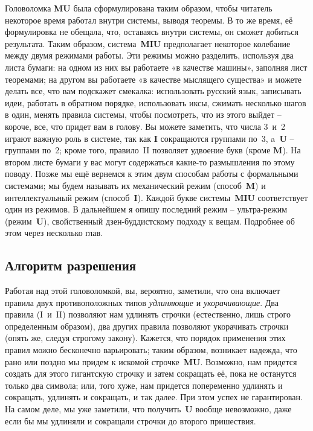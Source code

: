 \documentclass[../main.tex]{subfiles}
\begin{document}
Головоломка \textbf{MU} была сформулирована таким образом, чтобы читатель некоторое время работал внутри системы, выводя теоремы. В то же время, её формулировка не обещала, что, оставаясь внутри системы, он сможет добиться результата. Таким образом, система~\textbf{MIU} предполагает некоторое колебание между двумя режимами работы. Эти режимы можно разделить, используя два листа бумаги: на одном из них вы работаете «в качестве машины», заполняя лист теоремами; на другом вы работаете «в качестве мыслящего существа» и можете делать все, что вам подскажет смекалка: использовать русский язык, записывать идеи, работать в обратном порядке, использовать иксы, сжимать несколько шагов в один, менять правила системы, чтобы посмотреть, что из этого выйдет \--- короче, все, что придет вам в голову. Вы можете заметить, что числа 3~и~2 играют важную роль в системе, так как \textbf{I} сокращаются группами по~3, a~\textbf{U} \--- группами по~2; кроме того, правило~II позволяет удвоение букв (кроме \textbf{M}). На втором листе бумаги у вас могут содержаться какие-то размышления по этому поводу. Позже мы ещё вернемся к этим двум способам работы с формальными системами; мы будем называть их механический режим (способ~\textbf{M}) и интеллектуальный режим (способ~\textbf{I}). Каждой букве системы~\textbf{MIU} соответствует один из режимов. В дальнейшем я опишу последний режим \--- ультра-режим (режим~\textbf{U}), свойственный дзен-буддистскому подходу к вещам. Подробнее об этом через несколько глав.


\subsection{Алгоритм разрешения}

Работая над этой головоломкой, вы, вероятно, заметили, что она включает правила двух противоположных типов \emph{удлиняющие} и \emph{укорачивающие}. Два правила (I~и~II) позволяют нам удлинять строчки (естественно, лишь строго определенным образом), два других правила позволяют укорачивать строчки (опять же, следуя строгому закону). Кажется, что порядок применения этих правил можно бесконечно варьировать; таким образом, возникает надежда, что рано или поздно мы придем к искомой строчке~\textbf{MU}. Возможно, нам придется создать для этого гигантскую строчку и затем сокращать её, пока не останутся только два символа; или, того хуже, нам придется попеременно удлинять и сокращать, удлинять и сокращать, и так далее. При этом успех не гарантирован. На самом деле, мы уже заметили, что получить~\textbf{U} вообще невозможно, даже если бы мы удлиняли и сокращали строчки до второго пришествия.
\end{document}
